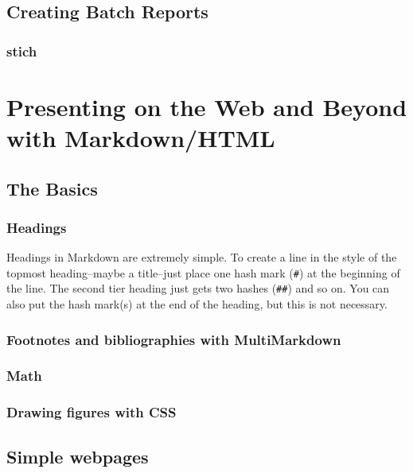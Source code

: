 \documentclass[ChapterTOCs,krantz1]{krantz}\usepackage{graphicx, color}
\begin{document}
\section{Creating Batch Reports}

\subsection{stich}




\chapter{Presenting on the Web and Beyond with Markdown/HTML}

\section{The Basics}

\subsection{Headings}

Headings in Markdown are extremely simple. To create a line in the style
of the topmost heading--maybe a title--just place one hash mark
(\texttt{\#}) at the beginning of the line. The second tier heading just
gets two hashes (\texttt{\#\#}) and so on. You can also put the hash
mark(s) at the end of the heading, but this is not necessary.

\subsection{Footnotes and bibliographies with MultiMarkdown}

\subsection{Math}

\subsection{Drawing figures with CSS}

\section{Simple webpages}
\end{document}
